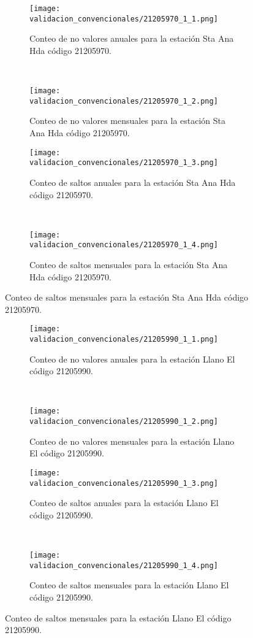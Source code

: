 \begin{figure}[H]\ContinuedFloat
\centering
	\begin{subfigure}[normla]{0.4\textwidth}
	\texttt{[image: validacion\_convencionales/21205970\_1\_1.png]}
		\caption{Conteo de no valores anuales para la estación Sta Ana Hda código 21205970.}
		\label{subfig:a1}
		\end{subfigure}
		~
    \begin{subfigure}[normla]{0.4\textwidth}
	\texttt{[image: validacion\_convencionales/21205970\_1\_2.png]}
		\caption{Conteo de no valores mensuales para la estación Sta Ana Hda código 21205970.}
		\label{subfig:a2}
		\end{subfigure}
		
    \begin{subfigure}[normla]{0.4\textwidth}
	\texttt{[image: validacion\_convencionales/21205970\_1\_3.png]}
		\caption{Conteo de saltos anuales para la estación Sta Ana Hda código 21205970.}
		\label{subfig:a1}
		\end{subfigure}
		~
    \begin{subfigure}[normla]{0.4\textwidth}
	\texttt{[image: validacion\_convencionales/21205970\_1\_4.png]}
		\caption{Conteo de saltos mensuales para la estación Sta Ana Hda código 21205970.}
		\label{subfig:a2}
		\end{subfigure}

	
\end{figure}
           
\begin{figure}[H]\ContinuedFloat
\centering
	\begin{subfigure}[normla]{0.4\textwidth}
	\texttt{[image: validacion\_convencionales/21205990\_1\_1.png]}
		\caption{Conteo de no valores anuales para la estación Llano El código 21205990.}
		\label{subfig:a1}
		\end{subfigure}
		~
    \begin{subfigure}[normla]{0.4\textwidth}
	\texttt{[image: validacion\_convencionales/21205990\_1\_2.png]}
		\caption{Conteo de no valores mensuales para la estación Llano El código 21205990.}
		\label{subfig:a2}
		\end{subfigure}
		
    \begin{subfigure}[normla]{0.4\textwidth}
	\texttt{[image: validacion\_convencionales/21205990\_1\_3.png]}
		\caption{Conteo de saltos anuales para la estación Llano El código 21205990.}
		\label{subfig:a1}
		\end{subfigure}
		~
    \begin{subfigure}[normla]{0.4\textwidth}
	\texttt{[image: validacion\_convencionales/21205990\_1\_4.png]}
		\caption{Conteo de saltos mensuales para la estación Llano El código 21205990.}
		\label{subfig:a2}
		\end{subfigure}

	
\end{figure}
           
